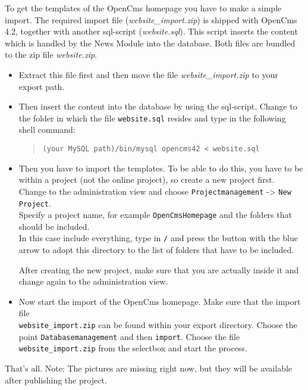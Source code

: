 To get the templates of the OpenCms homepage you have to make a simple import.
The required import file (\textit{website\_import.zip}) is shipped with OpenCms 4.2,
together with another sql-script (\textit{website.sql}). This script inserts the content
which is handled by the News Module into the database.
Both files are bundled to the zip file \textit{website.zip}.

\begin{itemize}
\item
Extract this file first and then move the file \textit{website\_import.zip} to your
export path.

\item
Then insert the content into the database by using the sql-script.
Change to the folder in which the file
\texttt{website.sql} resides and type in the following shell command:

\begin{quote}
\texttt{(your MySQL path)/bin/mysql opencms42 < website.sql}
\end{quote}

\item
Then you have to import the templates.
To be able to do this, you have to be within a project
(not the online project), so create a new
project first. \\
Change to the administration view and choose \texttt{Projectmanagement}
-> \texttt{New Project}.\\ 
Specify a project name, for example \texttt{OpenCmsHomepage} and the folders that
should be included. \\
In this case include everything, type in \texttt{/} and press
the button with the blue arrow to adopt this directory to the list of folders that
have to be included.

After creating the new project, make sure that you are actually inside it and
change again to the administration view. 

\item
Now start the import of the OpenCms homepage. 
Make sure that the import file \\
\texttt{website\_import.zip} can be found within your
export directory.
Choose the point \texttt{Databasemanagement} and then \texttt{import}.
Choose the file \texttt{website\_import.zip} from the selectbox and start the process.

\end{itemize}
That's all.
Note: The pictures are missing right now, but they will be available after
publishing the project.

